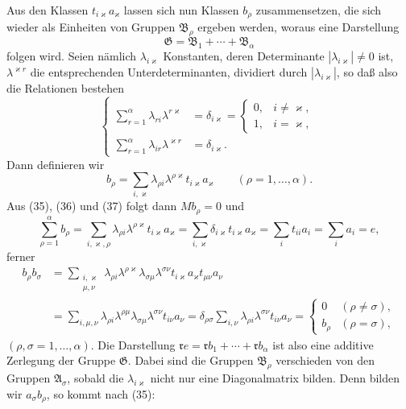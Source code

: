 \documentclass[11pt]{article}
\begin{document}
Aus den Klassen $t_{i\varkappa}a_\varkappa$ lassen sich nun Klassen $b_\rho$ zusammensetzen, die sich wieder als Einheiten von Gruppen $\mathfrak B_\rho$ ergeben werden, woraus eine Darstellung
\[
 \mathfrak G=\mathfrak B_1+\cdots+\mathfrak B_\alpha
\]
folgen wird. Seien nämlich $\lambda_{i\varkappa}$ Konstanten, deren Determinante $|\lambda_{i\varkappa}|\ne0$ ist, $\lambda^{\varkappa r}$ die entsprechenden Unterdeterminanten, dividiert durch $|\lambda_{i\varkappa}|$, so daß also die Relationen bestehen
\begin{equation}
\left\{
\begin{aligned}
 \sum_{r=1}^{\alpha}\lambda_{ri}\lambda^{r\varkappa}&=\delta_{i\varkappa}=\begin{cases}0,&i\ne\varkappa,\\1,&i=\varkappa,
 \end{cases}\\
 \sum_{r=1}^{\alpha}\lambda_{ir}\lambda^{\varkappa r}&=\delta_{i\varkappa}.
\end{aligned}\right.
\tag{36}
\end{equation}
Dann definieren wir
\begin{equation}
 b_\rho=\sum_{i,\varkappa}\lambda_{\rho i}\lambda^{\rho\varkappa}t_{i\varkappa}a_\varkappa
 \qquad(\rho=1,
\ldots,\alpha).
\tag{37}
\end{equation}
Aus (35), (36) und (37) folgt dann $Mb_\rho=0$ und
\begin{equation}
 \sum_{\rho=1}^{\alpha}b_\rho
 =\sum_{i,\varkappa,\rho}\lambda_{\rho i}\lambda^{\rho\varkappa}t_{i\varkappa}a_\varkappa
 =\sum_{i,\varkappa}\delta_{i\varkappa}t_{i\varkappa}a_\varkappa
 =\sum_i t_{ii}a_i=\sum_i a_i=e,
\tag{38}
\end{equation}
ferner
\[
\begin{aligned}
 b_\rho b_\sigma
 &=\sum_{\substack{i,\varkappa\\ \mu,\nu}}
  \lambda_{\rho i}\lambda^{\rho\varkappa}\lambda_{\sigma\mu}\lambda^{\sigma\nu}
  t_{i\varkappa}a_\varkappa t_{\mu\nu}a_\nu \\
 &=\sum_{i,\mu,\nu}\lambda_{\rho i}\lambda^{\rho\mu}\lambda_{\sigma\mu}\lambda^{\sigma\nu}t_{i\nu}a_\nu
 =\delta_{\rho\sigma}\sum_{i,\nu}\lambda_{\rho i}\lambda^{\sigma\nu}t_{i\nu}a_\nu
 =\begin{cases}0&(\rho\ne\sigma),\\ b_\rho&(\rho=\sigma),\end{cases}
\end{aligned}
\]
$(\rho,\sigma=1,
\ldots,\alpha)$. Die Darstellung $\mathfrak r e=\mathfrak r b_1+\cdots+\mathfrak r b_\alpha$ ist also eine additive Zerlegung der Gruppe $\mathfrak G$. Dabei sind die Gruppen $\mathfrak B_\rho$ verschieden von den Gruppen $\mathfrak A_\sigma$, sobald die $\lambda_{i\varkappa}$ nicht nur eine Diagonalmatrix bilden. Denn bilden wir $a_\sigma b_\rho$, so kommt nach (35):
\end{document}
